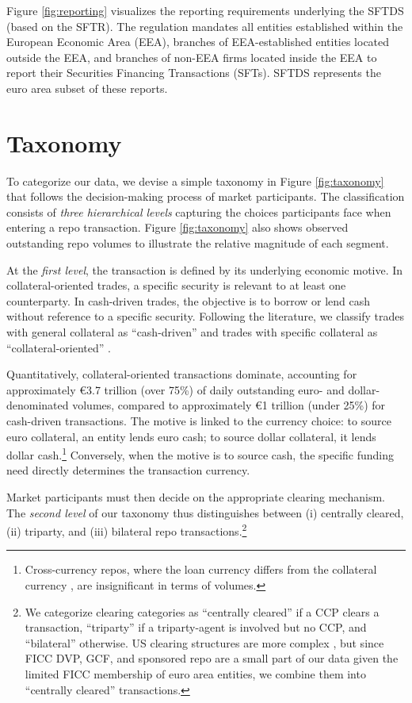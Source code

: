 \documentclass[english, 12pt, oneside]{article}
\begin{document}
Figure \ref{fig:reporting} visualizes the reporting requirements underlying the SFTDS (based on the SFTR). The regulation mandates all entities established within the European Economic Area (EEA), branches of EEA-established entities located outside the EEA, and branches of non-EEA firms located inside the EEA to report their Securities Financing Transactions (SFTs). SFTDS represents the euro area subset of these reports.


\section{Taxonomy}
\label{sec:taxonomy}

To categorize our data, we devise a simple taxonomy in Figure \ref{fig:taxonomy} that follows the decision-making process of market participants. The classification consists of \emph{three hierarchical levels} capturing the choices participants face when entering a repo transaction. Figure \ref{fig:taxonomy} also shows observed outstanding repo volumes to illustrate the relative magnitude of each segment.

At the \emph{first level}, the transaction is defined by its underlying economic motive. In collateral-oriented trades, a specific security is relevant to at least one counterparty. In cash-driven trades, the objective is to borrow or lend cash without reference to a specific security. Following the literature, we classify trades with general collateral as ``cash-driven'' and trades with specific collateral as ``collateral-oriented'' \citep[see for example][]{mancini2016, brand2019, schaffner2019}.

Quantitatively, collateral-oriented transactions dominate, accounting for approximately \euro 3.7 trillion (over 75\%) of daily outstanding euro- and dollar-denominated volumes, compared to approximately \euro 1 trillion (under 25\%) for cash-driven transactions. The motive is linked to the currency choice: to source euro collateral, an entity lends euro cash; to source dollar collateral, it lends dollar cash.\footnote{Cross-currency repos, where the loan currency differs from the collateral currency \citep[see][]{kohler2019}, are insignificant in terms of volumes.} Conversely, when the motive is to source cash, the specific funding need directly determines the transaction currency.

Market participants must then decide on the appropriate clearing mechanism. The \emph{second level} of our taxonomy thus distinguishes between (i) centrally cleared, (ii) triparty, and (iii) bilateral repo transactions.\footnote{We categorize clearing categories as ``centrally cleared'' if a CCP clears a transaction, ``triparty'' if a triparty-agent is involved but no CCP, and ``bilateral'' otherwise. US clearing structures are more complex \citep{copeland2024}, but since FICC DVP, GCF, and sponsored repo are a small part of our data given the limited FICC membership of euro area entities, we combine them into ``centrally cleared'' transactions.} 
\end{document}
